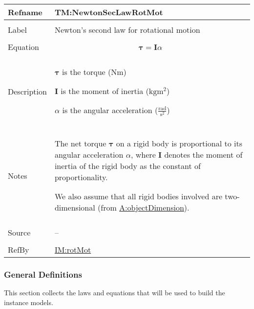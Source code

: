 \documentclass[12pt]{article}
\begin{document}
\vspace{\baselineskip}
\noindent
\begin{minipage}{\textwidth}
\begin{tabular}{>{\raggedright}p{}>{\raggedright\arraybackslash}p{}}
\toprule \textbf{Refname} & \textbf{TM:NewtonSecLawRotMot}
\label{TM:NewtonSecLawRotMot}
\\ \midrule \\
Label & Newton's second law for rotational motion
        
\\ \midrule \\
Equation & \begin{displaymath}
           \symbf{τ}=\symbf{I} α
           \end{displaymath}
\\ \midrule \\
Description & \begin{symbDescription}
              \item{$\symbf{τ}$ is the torque ($\text{N}\text{m}$)}
              \item{$\symbf{I}$ is the moment of inertia ($\text{kg}\text{m}^{2}$)}
              \item{$α$ is the angular acceleration ($\frac{\text{rad}}{\text{s}^{2}}$)}
              \end{symbDescription}
\\ \midrule \\
Notes & The net torque $\symbf{τ}$ on a rigid body is proportional to its angular acceleration $α$, where $\symbf{I}$ denotes the moment of inertia of the rigid body as the constant of proportionality.
        
        We also assume that all rigid bodies involved are two-dimensional (from \hyperref[assumpOD]{A:objectDimension}).
        
\\ \midrule \\
Source & --
         
\\ \midrule \\
RefBy & \hyperref[IM:rotMot]{IM:rotMot}
        
\\ \bottomrule
\end{tabular}
\end{minipage}
\subsubsection{General Definitions}
\label{Sec:GDs}
This section collects the laws and equations that will be used to build the instance models.
\end{document}
